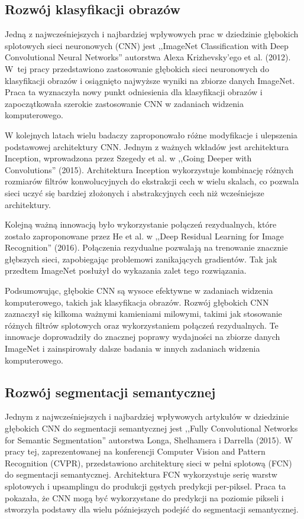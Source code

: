 \subsection{Rozwój klasyfikacji obrazów}
Jedną z najwcześniejszych i najbardziej wpływowych prac w dziedzinie głębokich splotowych sieci neuronowych (CNN) jest ,,ImageNet Classification with Deep Convolutional Neural Networks'' autorstwa Alexa Krizhevsky'ego et al. (2012)\cite{krizhevsky2017imagenet}. W~tej pracy przedstawiono zastosowanie głębokich sieci neuronowych do klasyfikacji obrazów i osiągnięto najwyższe wyniki na zbiorze danych ImageNet. Praca ta wyznaczyła nowy punkt odniesienia dla klasyfikacji obrazów i zapoczątkowała szerokie zastosowanie CNN w zadaniach widzenia komputerowego.

W kolejnych latach wielu badaczy zaproponowało różne modyfikacje i ulepszenia podstawowej architektury CNN. Jednym z ważnych wkładów jest architektura Inception, wprowadzona przez Szegedy et al. w ,,Going Deeper with Convolutions'' (2015)\cite{szegedy2015going}. Architektura Inception wykorzystuje kombinację różnych rozmiarów filtrów konwolucyjnych do ekstrakcji cech w wielu skalach, co pozwala sieci uczyć się bardziej złożonych i abstrakcyjnych cech niż wcześniejsze architektury.

Kolejną ważną innowacją było wykorzystanie połączeń rezydualnych, które zostało zaproponowane przez He et al. w ,,Deep Residual Learning for Image Recognition'' (2016)\cite{he2016deep}. Połączenia rezydualne pozwalają na trenowanie znacznie głębszych sieci, zapobiegając problemowi zanikających gradientów. Tak jak przedtem ImageNet posłużył do wykazania zalet tego rozwiązania.

Podsumowując, głębokie CNN są wysoce efektywne w zadaniach widzenia komputerowego, takich jak klasyfikacja obrazów. Rozwój głębokich CNN zaznaczył się kilkoma ważnymi kamieniami milowymi, takimi jak stosowanie różnych filtrów splotowych oraz wykorzystaniem połączeń rezydualnych. Te innowacje doprowadziły do znacznej poprawy wydajności na zbiorze danych ImageNet i zainspirowały dalsze badania w innych zadaniach widzenia komputerowego.
\subsection{Rozwój segmentacji semantycznej}
Jednym z najwcześniejszych i najbardziej wpływowych artykułów w dziedzinie głębokich CNN do segmentacji semantycznej jest ,,Fully Convolutional Networks for Semantic Segmentation'' autorstwa Longa, Shelhamera i Darrella (2015)\cite{fcn}. W pracy tej, zaprezentowanej na konferencji Computer Vision and Pattern Recognition (CVPR), przedstawiono architekturę sieci w pełni splotową (FCN) do segmentacji semantycznej. Architektura FCN wykorzystuje serię warstw splotowych i upsamplingu do produkcji gęstych predykcji per-piksel. Praca ta pokazała, że CNN mogą być wykorzystane do predykcji na poziomie pikseli i stworzyła podstawy dla wielu późniejszych podejść do segmentacji semantycznej.

